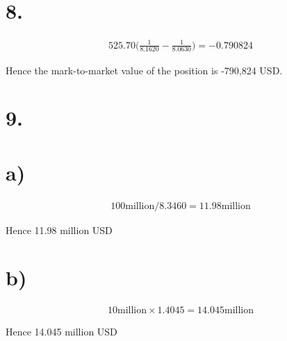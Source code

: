 \documentclass[paper=a4, fontsize=11pt]{scrartcl} %
\numberwithin{equation}{section} %
\numberwithin{figure}{section} %
\numberwithin{table}{section} %
\begin{document}
\section*{8.}

\begin{align*}
525.70 \Big(\frac{1}{8.1620} - \frac{1}{8.0630} \Big) = -0.790824 
\end{align*}

Hence the mark-to-market value of the position is -790,824 USD.  


\section*{9.}


\section*{a)}

\begin{align*}
100 \text{million}/8.3460 = 11.98 \text{million}
\end{align*}

Hence 11.98 million USD


\section*{b)}

\begin{align*}
10 \text{million}\times 1.4045 = 14.045 \text{million}
\end{align*}

Hence 14.045 million USD


\end{document}
